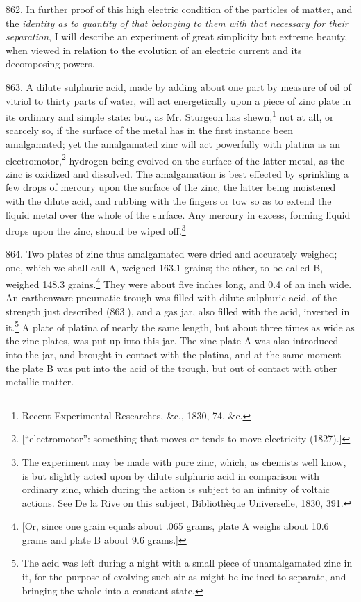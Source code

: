 862. In further proof of this high electric condition of the particles
of matter, and the \emph{identity as to quantity of that belonging to
them with that necessary for their separation}, I will describe an
experiment of great simplicity but extreme beauty, when viewed in
relation to the evolution of an electric current and its decomposing
powers.

863. A dilute sulphuric acid, made by adding about one part by measure
of oil of vitriol to thirty parts of water, will act energetically upon
a piece of zinc plate in its ordinary and simple state: but, as Mr.
Sturgeon has shewn,\footnote{Recent Experimental Researches, \&c., 1830,
  74, \&c.} not at all, or scarcely so, if the surface of the metal
has in the first instance been amalgamated; yet the amalgamated zinc
will act powerfully with platina as an electromotor,\footnote{{[}``electromotor'':
  something that moves or tends to move electricity (1827).{]}} hydrogen
being evolved on the surface of the latter metal, as the zinc is
oxidized and dissolved. The amalgamation is best effected by sprinkling
a few drops of mercury upon the surface of the zinc, the latter being
moistened with the dilute acid, and rubbing with the fingers or tow so
as to extend the liquid metal over the whole of the surface. Any mercury
in excess, forming liquid drops upon the zinc, should be wiped
off.\footnote{The experiment may be made with pure zinc, which, as
  chemists well know, is but slightly acted upon by dilute sulphuric
  acid in comparison with ordinary zinc, which during the action is
  subject to an infinity of voltaic actions. See De la Rive on this
  subject, Bibliothèque Universelle, 1830, 391.}

864. Two plates of zinc thus amalgamated were dried and accurately
weighed; one, which we shall call A, weighed 163.1 grains; the other, to
be called B, weighed 148.3 grains.\footnote{{[}Or, since one grain
  equals about .065 grams, plate A weighs about 10.6 grams and plate B
  about 9.6 grams.{]}} They were about five inches long, and 0.4 of an
inch wide. An earthenware pneumatic trough was filled with dilute
sulphuric acid, of the strength just described (863.), and a gas jar,
also filled with the acid, inverted in it.\footnote{The acid was left
  during a night with a small piece of unamalgamated zinc in it, for the
  purpose of evolving such air as might be inclined to separate, and
  bringing the whole into a constant state.} A plate of platina of
nearly the same length, but about three times as wide as the zinc
plates, was put up into this jar. The zinc plate A was also introduced
into the jar, and brought in contact with the platina, and at the same
moment the plate B was put into the acid of the trough, but out of
contact with other metallic matter.


